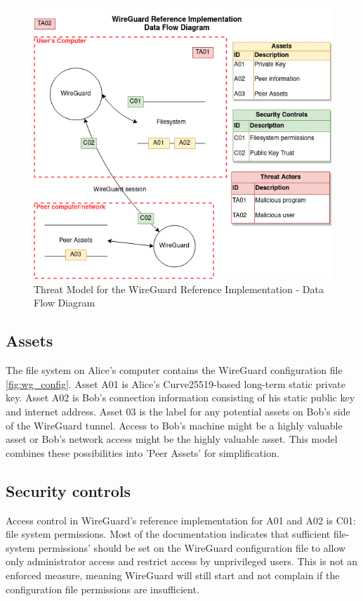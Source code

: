 \documentclass [11pt, proquest] {uwthesis}[2020/02/24]
\begin{document}
\begin{figure}[ht]
\includegraphics[width=14cm]{paper/images/WGH_DFD.drawio.png}
\caption{Threat Model for the WireGuard Reference Implementation - Data Flow Diagram}
\label{fig:wg_ref_dfd}
\end{figure}

\subsection{Assets}
The file system on Alice's computer contains the WireGuard configuration file \ref{fig:wg_config}. 
Asset A01 is Alice's Curve25519-based long-term static private key. Asset A02 is Bob's connection information consisting of his static public key and internet address. 
Asset 03 is the label for any potential assets on Bob's side of the WireGuard tunnel. Access to Bob's machine might be a highly valuable asset or Bob's network access might be the highly valuable asset. This model combines these possibilities into 'Peer Assets' for simplification.

\subsection{Security controls}
Access control in WireGuard's reference implementation for A01 and A02 is C01: file system permissions. Most of the documentation indicates that sufficient file-system permissions' should be set on the WireGuard configuration file to allow only administrator access and restrict access by unprivileged users. This is not an enforced measure, meaning WireGuard will still start and not complain if the configuration file permissions are insufficient. 
\end{document}
